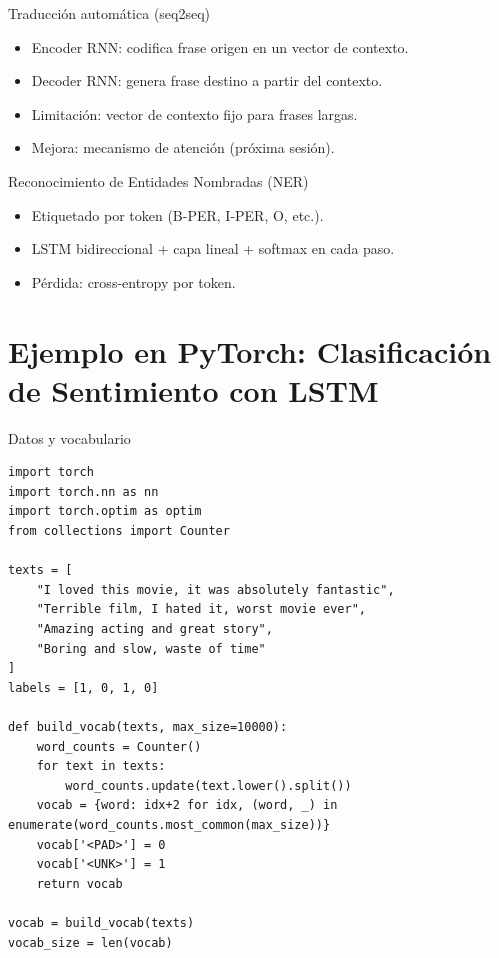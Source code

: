 \documentclass[aspectratio=169, 10pt, xcolor=table]{beamer}
\begin{document}
\begin{frame}{Traducción automática (seq2seq)}
    \begin{itemize}
        \item Encoder RNN: codifica frase origen en un vector de contexto.
        \item Decoder RNN: genera frase destino a partir del contexto.
        \item Limitación: vector de contexto fijo para frases largas.
        \item Mejora: mecanismo de atención (próxima sesión).
    \end{itemize}
\end{frame}

\begin{frame}{Reconocimiento de Entidades Nombradas (NER)}
    \begin{itemize}
        \item Etiquetado por token (B-PER, I-PER, O, etc.).
        \item LSTM bidireccional + capa lineal + softmax en cada paso.
        \item Pérdida: cross-entropy por token.
    \end{itemize}
\end{frame}

\section{Ejemplo en PyTorch: Clasificación de Sentimiento con LSTM}

\begin{frame}[fragile]{Datos y vocabulario}
    \begin{lstlisting}
import torch
import torch.nn as nn
import torch.optim as optim
from collections import Counter

texts = [
    "I loved this movie, it was absolutely fantastic",
    "Terrible film, I hated it, worst movie ever",
    "Amazing acting and great story",
    "Boring and slow, waste of time"
]
labels = [1, 0, 1, 0]

def build_vocab(texts, max_size=10000):
    word_counts = Counter()
    for text in texts:
        word_counts.update(text.lower().split())
    vocab = {word: idx+2 for idx, (word, _) in enumerate(word_counts.most_common(max_size))}
    vocab['<PAD>'] = 0
    vocab['<UNK>'] = 1
    return vocab

vocab = build_vocab(texts)
vocab_size = len(vocab)
    \end{lstlisting}
\end{frame}
\end{document}
